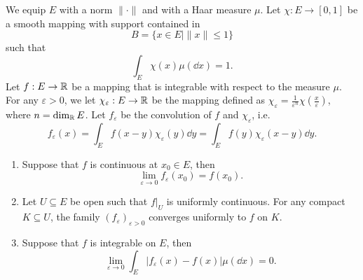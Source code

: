 \begin{propositionenv}
    We equip $E$ with a norm $\|\cdot\|$ and with a Haar measure $\mu$.
    Let $\chi : E \rightarrow [0,1]$ be a smooth mapping with support contained in
    $$B = \{x \in E \mid \|x\| \le 1\}$$
    such that
    $$\int_{E} \chi(x) \mu(\dd x) = 1.$$
    Let $f : E \rightarrow \mathbb{R}$ be a mapping that is integrable with respect to the measure $\mu$.
    For any $\varepsilon > 0$, we let $\chi_{\varepsilon} : E \rightarrow \mathbb{R}$ be the mapping defined as $\chi_{\varepsilon} = \frac{1}{\varepsilon^n}\chi(\frac{x}{\varepsilon})$,
    where $n = \dim_{\mathbb{R}} E$.
    Let $f_\varepsilon$ be the convolution of $f$ and $\chi_{\varepsilon}$, i.e.
    $$f_\varepsilon(x) = \int_{E} f(x-y)\chi_{\varepsilon}(y)\dd y = \int_{E} f(y)\chi_{\varepsilon}(x-y)\dd y.$$
    \begin{enumerate}[label=(\arabic*)]
        \item Suppose that $f$ is continuous at $x_0 \in E$, then
            $$\lim_{\varepsilon \to 0} f_\varepsilon(x_0) = f(x_0).$$
        \item Let $U \subseteq E$ be open such that $f|_U$ is uniformly continuous.
            For any compact $K \subseteq U$, the family $(f_{\varepsilon})_{\varepsilon > 0}$ converges uniformly to $f$ on $K$.
        \item Suppose that $f$ is integrable on $E$, then
            $$\lim_{\varepsilon \to 0} \int_{E} |f_\varepsilon(x) - f(x)| \mu(\dd x) = 0.$$
    \end{enumerate}
\end{propositionenv}
